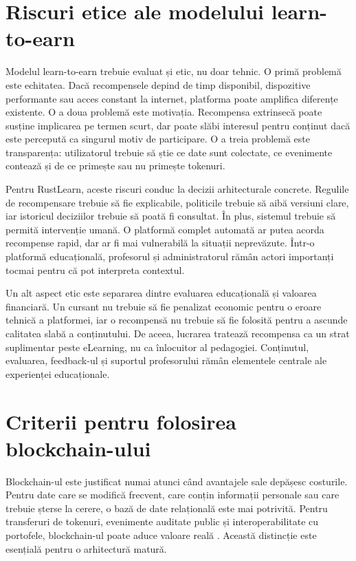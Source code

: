 \section{Riscuri etice ale modelului learn-to-earn}
Modelul learn-to-earn trebuie evaluat și etic, nu doar tehnic. O primă problemă este echitatea. Dacă recompensele depind de timp disponibil, dispozitive performante sau acces constant la internet, platforma poate amplifica diferențe existente. O a doua problemă este motivația. Recompensa extrinsecă poate susține implicarea pe termen scurt, dar poate slăbi interesul pentru conținut dacă este percepută ca singurul motiv de participare. O a treia problemă este transparența: utilizatorul trebuie să știe ce date sunt colectate, ce evenimente contează și de ce primește sau nu primește tokenuri.

Pentru RustLearn, aceste riscuri conduc la decizii arhitecturale concrete. Regulile de recompensare trebuie să fie explicabile, politicile trebuie să aibă versiuni clare, iar istoricul deciziilor trebuie să poată fi consultat. În plus, sistemul trebuie să permită intervenție umană. O platformă complet automată ar putea acorda recompense rapid, dar ar fi mai vulnerabilă la situații neprevăzute. Într-o platformă educațională, profesorul și administratorul rămân actori importanți tocmai pentru că pot interpreta contextul.

Un alt aspect etic este separarea dintre evaluarea educațională și valoarea financiară. Un cursant nu trebuie să fie penalizat economic pentru o eroare tehnică a platformei, iar o recompensă nu trebuie să fie folosită pentru a ascunde calitatea slabă a conținutului. De aceea, lucrarea tratează recompensa ca un strat suplimentar peste eLearning, nu ca înlocuitor al pedagogiei. Conținutul, evaluarea, feedback-ul și suportul profesorului rămân elementele centrale ale experienței educaționale.

\section{Criterii pentru folosirea blockchain-ului}
Blockchain-ul este justificat numai atunci când avantajele sale depășesc costurile. Pentru date care se modifică frecvent, care conțin informații personale sau care trebuie șterse la cerere, o bază de date relațională este mai potrivită. Pentru transferuri de tokenuri, evenimente auditate public și interoperabilitate cu portofele, blockchain-ul poate aduce valoare reală \cite{ethereumWhitepaper,mdpi2023web3}. Această distincție este esențială pentru o arhitectură matură.

